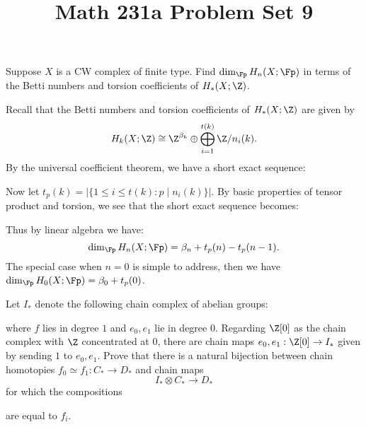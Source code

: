 \documentclass[11pt,letterpaper]{article}
\title{\textbf{Math 231a Problem Set 9}}
\providecommand{\tors}{\text{tors}}
\begin{document}
\maketitle

\begin{problem}
    Suppose $X$ is a CW complex of finite type. Find $\dim_{\Fp}H_n(X;\Fp)$ in terms of the Betti numbers and torsion coefficients of $H_*(X; \Z)$.
\end{problem}

\begin{solution}
    \quad Recall that the Betti numbers and torsion coefficients of $H_*(X; \Z)$ are given by
    \[
        H_k(X; \Z) \cong \Z^{\beta_k}\oplus\bigoplus^{t(k)}_{i=1}\Z /n_i(k)
    .\] 
    By the universal coefficient theorem, we have a short exact sequence:
    \begin{center}
    \end{center}
    Now let $t_p(k)=|\{1 \leq i \leq t(k) : p\mid n_i(k)\}|$. By basic properties of tensor product and torsion, we see that the short exact sequence becomes:
    \begin{center}
    \end{center}
    Thus by linear algebra we have:
    \[
        \dim_{\Fp} H_n(X; \Fp) = \beta_n + t_p(n) - t_p(n-1)
    .\] 
    The special case when $n=0$ is simple to address, then we have $\dim_{\Fp} H_0(X; \Fp) = \beta_0 + t_p(0)$.
\end{solution}

\begin{problem}
    Let $I_*$ denote the following chain complex of abelian groups:
    \begin{center}
    \end{center}
    where $f$ lies in degree $1$ and $e_0,e_1$ lie in degree $0$. Regarding $\Z[0]$ as the chain complex with $\Z$ concentrated at $0$, there are chain maps $e_0,e_1 : \Z[0] \to I_*$ given by sending $1$ to $e_0,e_1$. Prove that there is a natural bijection between chain homotopies $f_0\simeq f_1 : C_* \to D_*$ and chain maps 
    \[
        I_*\otimes C_* \to D_*
    \]
    for which the compositions
    \begin{center}
    \end{center}
    are equal to $f_i$.
\end{problem}
\end{document}
